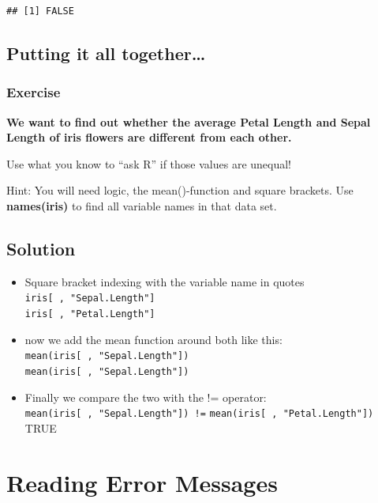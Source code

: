 \documentclass[
]{book}
\providecommand{\tightlist}{%
  \setlength{\itemsep}{0pt}\setlength{\parskip}{0pt}}
\begin{document}
\begin{verbatim}
## [1] FALSE
\end{verbatim}

\subsection{Putting it all together\ldots{}}\label{putting-it-all-together}

\subsubsection{Exercise}\label{exercise-1}

\textbf{We want to find out whether the average Petal Length and Sepal Length of iris flowers are different from each other.}

Use what you know to ``ask R'' if those values are unequal!

Hint: You will need logic, the mean()-function and square brackets. Use \textbf{names(iris)} to find all variable names in that data set.

\subsection{Solution}\label{solution-1}

\begin{itemize}
\tightlist
\item
  Square bracket indexing with the variable name in quotes \newline
  \texttt{iris{[}\ ,\ "Sepal.Length"{]}}\\
  \texttt{iris{[}\ ,\ "Petal.Length"{]}}
\item
  now we add the mean function around both like this:
  \texttt{mean(iris{[}\ ,\ "Sepal.Length"{]})}\\
  \texttt{mean(iris{[}\ ,\ "Sepal.Length"{]})}
\item
  Finally we compare the two with the != operator:
  \texttt{mean(iris{[}\ ,\ "Sepal.Length"{]})\ !=}
  \texttt{mean(iris{[}\ ,\ "Petal.Length"{]})}\\
  TRUE
\end{itemize}

\section{Reading Error Messages}\label{reading-error-messages}
\end{document}
